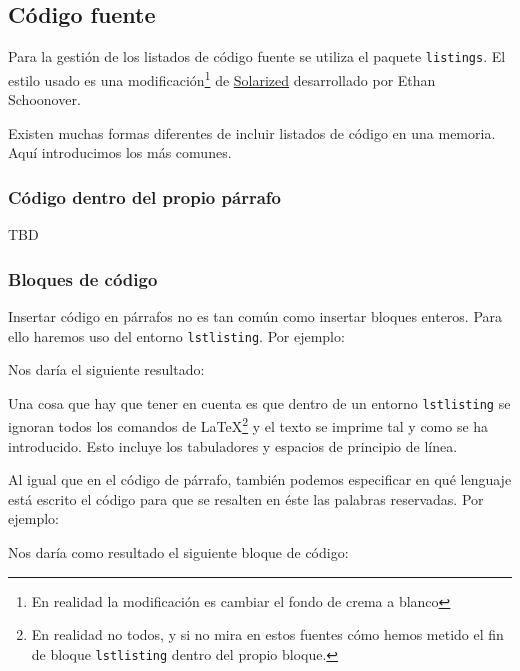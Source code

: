 \documentclass[%
    school=etsisi,%
    degree=61TI,%
]{upm-report}
\begin{document}
\subsection{Código fuente}

Para la gestión de los listados de código fuente se utiliza el paquete \texttt{listings}. El estilo usado es una modificación\footnote{En realidad la modificación es cambiar el fondo de crema a blanco} de \href{https://ethanschoonover.com/solarized/}{Solarized} desarrollado por Ethan Schoonover.

Existen muchas formas diferentes de incluir listados de código en una memoria. Aquí introducimos los más comunes.

\subsubsection{Código dentro del propio párrafo}

TBD

\subsubsection{Bloques de código}

Insertar código en párrafos no es tan común como insertar bloques enteros. Para ello haremos uso del entorno \texttt{lstlisting}. Por ejemplo:



Nos daría el siguiente resultado:



Una cosa que hay que tener en cuenta es que dentro de un entorno \texttt{lstlisting} se ignoran todos los comandos de \LaTeX\space\footnote{En realidad no todos, y si no mira en estos fuentes cómo hemos metido el fin de bloque \texttt{lstlisting} dentro del propio bloque.} y el texto se imprime tal y como se ha introducido. Esto incluye los tabuladores y espacios de principio de línea.

Al igual que en el código de párrafo, también podemos especificar en qué lenguaje está escrito el código para que se resalten en éste las palabras reservadas. Por ejemplo:



Nos daría como resultado el siguiente bloque de código:
 
\end{document}
